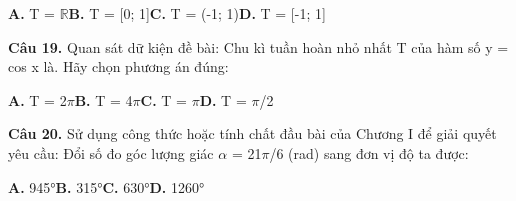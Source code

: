 \documentclass[11pt,a4paper]{article}
\begin{document}
\hspace*{1.5em}\textbf{A.} T = $\mathbb{R}$\quad\quad \textbf{B.} T = [0; 1]\quad\quad \textbf{C.} T = (-1; 1)\quad\quad \textbf{D.} T = [-1; 1]\par\vspace{2pt}
\textbf{\color{primary} Câu 19.} Quan sát dữ kiện đề bài: Chu kì tuần hoàn nhỏ nhất T của hàm số y = cos x là. Hãy chọn phương án đúng:\par
\hspace*{1.5em}\textbf{A.} T = 2$\pi$\quad\quad \textbf{B.} T = 4$\pi$\quad\quad \textbf{C.} T = $\pi$\quad\quad \textbf{D.} T = $\pi$/2\par\vspace{2pt}
\textbf{\color{primary} Câu 20.} Sử dụng công thức hoặc tính chất đầu bài của Chương I để giải quyết yêu cầu: Đổi số đo góc lượng giác $\alpha$ = 21$\pi$/6 (rad) sang đơn vị độ ta được:\par
\hspace*{1.5em}\textbf{A.} 945°\quad\quad \textbf{B.} 315°\quad\quad \textbf{C.} 630°\quad\quad \textbf{D.} 1260°\par\vspace{2pt}
\end{document}
